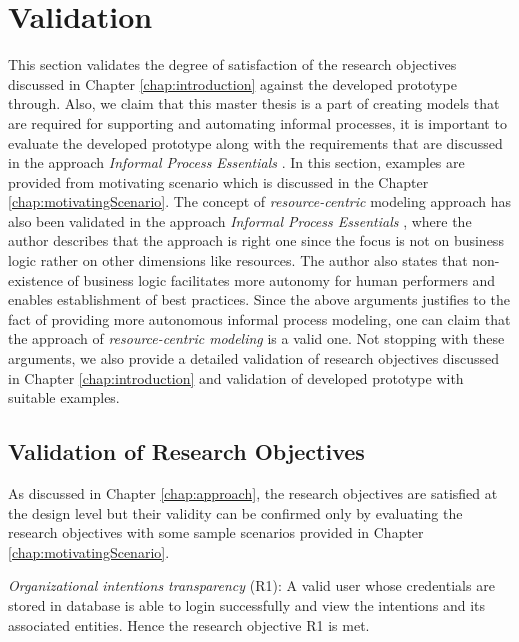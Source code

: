 \section{Validation}
\label{sec:validation}
This section validates the degree of satisfaction of the research objectives discussed in Chapter \ref{chap:introduction} against the developed prototype through. Also, we claim that this master thesis is a part of creating models that are required for supporting and automating informal processes, it is important to evaluate the developed prototype along with the requirements that are discussed in the approach \textit{Informal Process Essentials} \cite{Sungur2014a}. In this section, examples are provided from motivating scenario which is discussed in the Chapter \ref{chap:motivatingScenario}. The concept of \textit{resource-centric} modeling approach has also been validated in the approach \textit{Informal Process Essentials} \cite{Sungur2014a}, where the author describes that the approach is right one since the focus is not on business logic rather on other dimensions like resources. The author also states that non-existence of business logic facilitates more autonomy for human performers and enables establishment of best practices. Since the above arguments justifies to the fact of providing more autonomous informal process modeling, one can claim that the approach of \textit{resource-centric modeling} is a valid one. Not stopping with these arguments, we also provide a detailed validation of research objectives discussed in Chapter \ref{chap:introduction} and validation of developed prototype with suitable examples.
		
\subsection{Validation of Research Objectives}
\label{subsec:validationofrequirements}
As discussed in Chapter \ref{chap:approach}, the research objectives are satisfied at the design level but their validity can be confirmed only by evaluating the research objectives with some sample scenarios provided in Chapter \ref{chap:motivatingScenario}.   

\textit{Organizational intentions transparency} (R1): A valid user whose credentials are stored in database is able to login successfully and view the intentions and its associated entities. Hence the research objective R1 is met.

